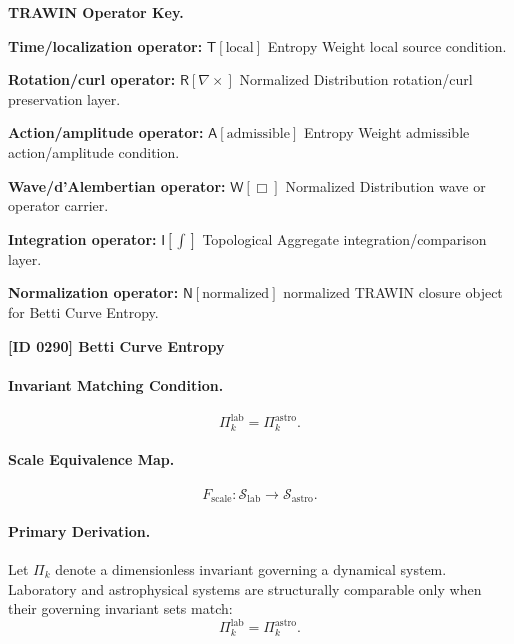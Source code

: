 \par\vspace{0.45\baselineskip}
\noindent\begin{minipage}[t]{\linewidth}
\begingroup
\small
\raggedright
\textbf{TRAWIN Operator Key.}\par
\noindent\textbf{Time/localization operator:} $\mathsf{T}\!\left[\mathrm{local}\right]$ Entropy Weight local source condition.\par
\noindent\textbf{Rotation/curl operator:} $\mathsf{R}\!\left[\nabla\times\right]$ Normalized Distribution rotation/curl preservation layer.\par
\noindent\textbf{Action/amplitude operator:} $\mathsf{A}\!\left[\mathrm{admissible}\right]$ Entropy Weight admissible action/amplitude condition.\par
\noindent\textbf{Wave/d'Alembertian operator:} $\mathsf{W}\!\left[\Box\right]$ Normalized Distribution wave or operator carrier.\par
\noindent\textbf{Integration operator:} $\mathsf{I}\!\left[\int\right]$ Topological Aggregate integration/comparison layer.\par
\noindent\textbf{Normalization operator:} $\mathsf{N}\!\left[\mathrm{normalized}\right]$ normalized TRAWIN closure object for Betti Curve Entropy.\par
\endgroup
\end{minipage}

\clearpage
\noindent\textbf{[ID 0290] Betti Curve Entropy}\par
\vspace{0.35em}
\paragraph{Invariant Matching Condition.}
\begin{equation}
\Pi_k^{\mathrm{lab}}
=
\Pi_k^{\mathrm{astro}} .
\end{equation}

\paragraph{Scale Equivalence Map.}
\begin{equation}
F_{\mathrm{scale}}:
\mathcal{S}_{\mathrm{lab}}
\longrightarrow
\mathcal{S}_{\mathrm{astro}} .
\end{equation}

\paragraph{Primary Derivation.}
Let $\Pi_k$ denote a dimensionless invariant governing a dynamical system.  
Laboratory and astrophysical systems are structurally comparable only when their governing invariant sets match:
\begin{equation}
\Pi_k^{\mathrm{lab}}
=
\Pi_k^{\mathrm{astro}} .
\end{equation}

